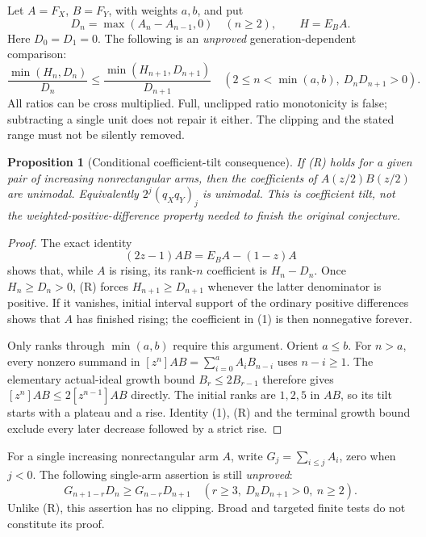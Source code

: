 \documentclass[11pt]{article}
\newtheorem{proposition}{Proposition}[section]
\begin{document}
\par\medskip

Let $A=F_X$, $B=F_Y$, with weights $a,b$, and put
\[
 D_n=\max(A_n-A_{n-1},0)\quad(n\ge2),\qquad H=E_B A.
\]
Here $D_0=D_1=0$. The following is an \emph{unproved}
generation-dependent comparison:
\[
 \frac{\min(H_n,D_n)}{D_n}\le
 \frac{\min(H_{n+1},D_{n+1})}{D_{n+1}}
 \quad\left(2\le n<\min(a,b),\ D_nD_{n+1}>0\right).
                                                        \tag{R}
\]
All ratios can be cross multiplied. Full, unclipped ratio
monotonicity is false; subtracting a single unit does not
repair it either. The clipping and the stated range must
not be silently removed.

\begin{proposition}[Conditional coefficient-tilt consequence]
If (R) holds for a given pair of increasing nonrectangular
arms, then the coefficients of $A(z/2)B(z/2)$ are unimodal.
Equivalently $2^j(q_Xq_Y)_j$ is unimodal.
This is coefficient tilt, not the weighted-positive-difference
property needed to finish the original conjecture.
\end{proposition}
\begin{proof}
The exact identity
\[
 (2z-1)AB=E_B A-(1-z)A                              \tag{1}
\]
shows that, while $A$ is rising, its rank-$n$ coefficient
is $H_n-D_n$. Once $H_n\ge D_n>0$, (R) forces
$H_{n+1}\ge D_{n+1}$ whenever the latter denominator is
positive. If it vanishes, initial interval support of the
ordinary positive differences shows that $A$ has finished
rising; the coefficient in (1) is then nonnegative forever.

Only ranks through $\min(a,b)$ require this argument.
Orient $a\le b$. For $n>a$, every nonzero summand in
$[z^n]AB=\sum_{i=0}^{a}A_iB_{n-i}$ uses $n-i\ge1$.
The elementary actual-ideal growth bound
$B_r\le2B_{r-1}$ therefore gives
$[z^n]AB\le2[z^{n-1}]AB$ directly. The initial ranks
are $1,2,5$ in $AB$, so its tilt starts with a plateau
and a rise. Identity (1), (R) and the terminal growth bound
exclude every later decrease followed by a strict rise.
\end{proof}


\par\medskip

For a single increasing nonrectangular arm $A$, write
$G_j=\sum_{i\le j}A_i$, zero when $j<0$. The following
single-arm assertion is still \emph{unproved}:
\[
 G_{n+1-r}D_n\ge G_{n-r}D_{n+1}
 \quad\left(r\ge3,\ D_nD_{n+1}>0,\ n\ge2\right).
                                                        \tag{C}
\]
Unlike (R), this assertion has no clipping. Broad and targeted
finite tests do not constitute its proof.
\end{document}
